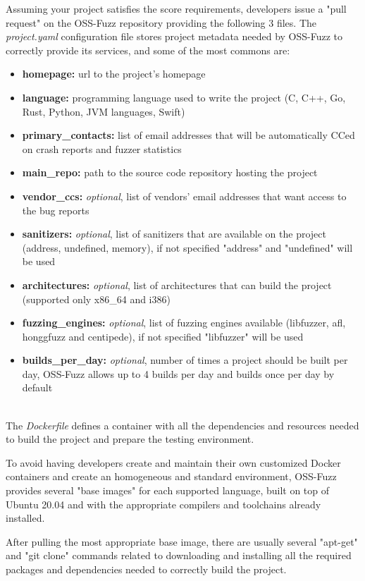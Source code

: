 \newpage
Assuming your project satisfies the score requirements, developers issue a "pull request" on the OSS-Fuzz repository providing the following 3 files.
The \textit{project.yaml} configuration file stores project metadata needed by OSS-Fuzz to correctly provide its services, and some of the most commons are:
\begin{itemize}
    \item \textbf{homepage:} url to the project's homepage
    \item \textbf{language:} programming language used to write the project (C, C++, Go, Rust, Python, JVM languages, Swift)
    \item \textbf{primary\_contacts:} list of email addresses that will be automatically CCed on crash reports and fuzzer statistics
    \item \textbf{main\_repo:} path to the source code repository hosting the project
    \item \textbf{vendor\_ccs:} \textit{optional}, list of vendors' email addresses that want access to the bug reports
    \item \textbf{sanitizers:} \textit{optional}, list of sanitizers that are available on the project (address, undefined, memory), if not specified "address" and "undefined" will be used
    \item \textbf{architectures:} \textit{optional}, list of architectures that can build the project (supported only x86\_64 and i386)
    \item \textbf{fuzzing\_engines:} \textit{optional}, list of fuzzing engines available (libfuzzer, afl, honggfuzz and centipede), if not specified "libfuzzer" will be used
    \item \textbf{builds\_per\_day:} \textit{optional}, number of times a project should be built per day, OSS-Fuzz allows up to 4 builds per day and builds once per day by default
\end{itemize}
\ \\
The \textit{Dockerfile} defines a container with all the dependencies and resources needed to build the project and prepare the testing environment.

To avoid having developers create and maintain their own customized Docker containers and create an homogeneous and standard environment, OSS-Fuzz provides several "base images" for each supported language, built on top of Ubuntu 20.04 and with the appropriate compilers and toolchains already installed.

After pulling the most appropriate base image, there are usually several "apt-get" and "git clone" commands related to downloading and installing all the required packages and dependencies needed to correctly build the project.

